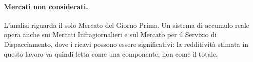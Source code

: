 \paragraph{Mercati non considerati.} L'analisi riguarda il solo Mercato del Giorno Prima.
Un sistema di accumulo reale opera anche sui Mercati Infragiornalieri e sul Mercato per il
Servizio di Dispacciamento, dove i ricavi possono essere significativi: la redditivit\`a
stimata in questo lavoro va quindi letta come una componente, non come il totale.

